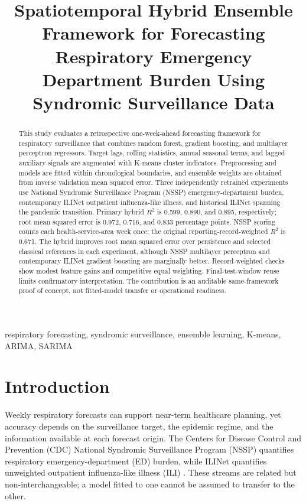 \documentclass[conference,a4paper]{IEEEtran}
\title{Spatiotemporal Hybrid Ensemble Framework for Forecasting Respiratory Emergency Department Burden Using Syndromic Surveillance Data}
\author{\IEEEauthorblockN{Alexander Roque}
\IEEEauthorblockA{Department of Engineering\\Norfolk State University\\Norfolk, VA, USA\\a.d.roque@spartans.nsu.edu}
\and
\IEEEauthorblockN{Isaac Osunmakinde}
\IEEEauthorblockA{Department of Computer Science\\Norfolk State University\\Norfolk, VA, USA\\ioosunmakinde@nsu.edu}}
\begin{document}
\maketitle
\begin{abstract}
This study evaluates a retrospective one-week-ahead forecasting framework for respiratory surveillance that combines random forest, gradient boosting, and multilayer perceptron regressors. Target lags, rolling statistics, annual seasonal terms, and lagged auxiliary signals are augmented with K-means cluster indicators. Preprocessing and models are fitted within chronological boundaries, and ensemble weights are obtained from inverse validation mean squared error. Three independently retrained experiments use National Syndromic Surveillance Program (NSSP) emergency-department burden, contemporary ILINet outpatient influenza-like illness, and historical ILINet spanning the pandemic transition. Primary hybrid $R^2$ is 0.599, 0.890, and 0.895, respectively; root mean squared error is 0.972, 0.716, and 0.833 percentage points. NSSP scoring counts each health-service-area week once; the original reporting-record-weighted $R^2$ is 0.671. The hybrid improves root mean squared error over persistence and selected classical references in each experiment, although NSSP multilayer perceptron and contemporary ILINet gradient boosting are marginally better. Record-weighted checks show modest feature gains and competitive equal weighting. Final-test-window reuse limits confirmatory interpretation. The contribution is an auditable same-framework proof of concept, not fitted-model transfer or operational readiness.
\end{abstract}
\begin{IEEEkeywords}
respiratory forecasting, syndromic surveillance, ensemble learning, K-means, ARIMA, SARIMA
\end{IEEEkeywords}

\section{Introduction}
Weekly respiratory forecasts can support near-term healthcare planning, yet accuracy depends on the surveillance target, the epidemic regime, and the information available at each forecast origin. The Centers for Disease Control and Prevention (CDC) National Syndromic Surveillance Program (NSSP) quantifies respiratory emergency-department (ED) burden, while ILINet quantifies unweighted outpatient influenza-like illness (ILI) \cite{nssp,guide,ilinet}. These streams are related but non-interchangeable; a model fitted to one cannot be assumed to transfer to the other.
\end{document}
